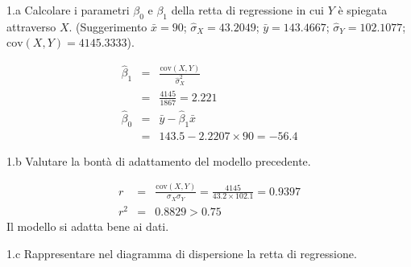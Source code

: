 \documentclass[
  11pt,
]{book}
\theoremstyle{mytheoremstyle}
\theoremstyle{mydefstyle}
\newenvironment{sol}
  {
  \begin{tcolorbox}[enhanced,breakable,arc=0.1mm,boxrule=1pt,colback=white,colframe=iblue,
  title=\bf \fontfamily{lmss}\selectfont \hspace{.5 cm} Soluzione,drop fuzzy shadow]

}{
\end{tcolorbox}
  }
\begin{document}
1.a Calcolare i parametri \(\beta_{0}\) e \(\beta_{1}\)
della retta di regressione in cui \(Y\) è spiegata attraverso \(X\).
(Suggerimento \(\bar{x} = 90\); \(\hat\sigma_{X} = 43.2049\);
\(\bar{y} = 143.4667\); \(\hat\sigma_{Y} = 102.1077\); \(\text{cov}(X,Y)= 4145.3333\)).

\begin{sol}
\begin{eqnarray*}
       \hat\beta_1 &=& \frac{\text{cov}(X,Y)}{\hat\sigma_X^2} \\
            &=& \frac{ 4145 }{ 1867 }  =  2.221 \\
      \hat\beta_0 &=& \bar y - \hat\beta_1 \bar x\\
          &=&  143.5 - 2.2207 \times  90 = -56.4 
      \end{eqnarray*}

\end{sol}

1.b Valutare la bontà di adattamento del modello precedente.

\begin{sol}
\begin{eqnarray*}
r&=&\frac{\text{cov}(X,Y)}{\sigma_X\sigma_Y}=\frac{ 4145 }{ 43.2 \times 102.1 }= 0.9397 \\r^2&=& 0.8829 > 0.75
\end{eqnarray*}
Il modello si adatta bene ai dati.

\end{sol}

1.c Rappresentare nel diagramma di dispersione la retta di regressione.
\end{document}
